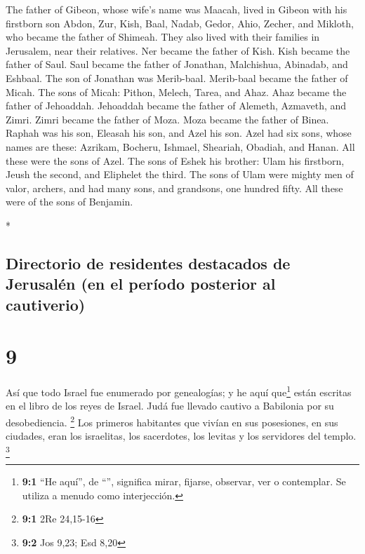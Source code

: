 \begin{paracol}{2}
\begin{otherlanguage}{english}
 The father of Gibeon, whose wife's name was Maacah,
lived in Gibeon  with his firstborn son Abdon, Zur, Kish,
Baal, Nadab,  Gedor, Ahio, Zecher,  and
Mikloth, who became the father of Shimeah. They also lived with their
families in Jerusalem, near their relatives.  Ner became
the father of Kish. Kish became the father of Saul. Saul became the
father of Jonathan, Malchishua, Abinadab, and Eshbaal. 
The son of Jonathan was Merib-baal. Merib-baal became the father of
Micah.  The sons of Micah: Pithon, Melech, Tarea, and
Ahaz.  Ahaz became the father of Jehoaddah. Jehoaddah
became the father of Alemeth, Azmaveth, and Zimri. Zimri became the
father of Moza.  Moza became the father of Binea. Raphah
was his son, Eleasah his son, and Azel his son.  Azel had
six sons, whose names are these: Azrikam, Bocheru, Ishmael, Sheariah,
Obadiah, and Hanan. All these were the sons of Azel.  The
sons of Eshek his brother: Ulam his firstborn, Jeush the second, and
Eliphelet the third.  The sons of Ulam were mighty men of
valor, archers, and had many sons, and grandsons, one hundred fifty. All
these were of the sons of Benjamin.

\end{otherlanguage}

\switchcolumn[0]*

\hypertarget{directorio-de-residentes-destacados-de-jerusaluxe9n-en-el-peruxedodo-posterior-al-cautiverio}{%
\subsection{Directorio de residentes destacados de Jerusalén (en el
período posterior al
cautiverio)}\label{directorio-de-residentes-destacados-de-jerusaluxe9n-en-el-peruxedodo-posterior-al-cautiverio}}

\hypertarget{section-16}{%
\section{9}\label{section-16}}

 Así que todo Israel fue enumerado por genealogías; y he
aquí que\footnote{\textbf{9:1} ``He aquí'', de ``'',
  significa mirar, fijarse, observar, ver o contemplar. Se utiliza a
  menudo como interjección.} están escritas en el libro de los reyes de
Israel. Judá fue llevado cautivo a Babilonia por su desobediencia.
\footnote{\textbf{9:1} 2Re 24,15-16}  Los primeros
habitantes que vivían en sus posesiones, en sus ciudades, eran los
israelitas, los sacerdotes, los levitas y los servidores del templo.
\footnote{\textbf{9:2} Jos 9,23; Esd 8,20}


\end{paracol}
